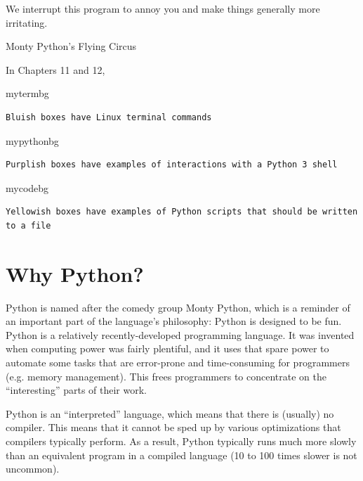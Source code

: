 
\epigraph{We interrupt this program to annoy you and make things generally more irritating.}{Monty Python's Flying Circus}

\minitoc

In Chapters 11 and 12,
\begin{tsession}{mytermbg}
\begin{verbatim}
Bluish boxes have Linux terminal commands
\end{verbatim}
\end{tsession}
\begin{tsession}{mypythonbg}
\begin{verbatim}
Purplish boxes have examples of interactions with a Python 3 shell
\end{verbatim}
\end{tsession}
\begin{tsession}{mycodebg}
\begin{verbatim}
Yellowish boxes have examples of Python scripts that should be written to a file
\end{verbatim}
\end{tsession}

\section{Why Python?}

Python is named after the comedy group Monty Python,
which is a reminder of an important part of the language's philosophy:
Python is designed to be fun.
Python is a relatively recently-developed programming language.
It was invented when computing power was fairly plentiful,
and it uses that spare power to automate some tasks
that are error-prone and time-consuming for programmers (e.g. memory management).
This frees programmers to concentrate on the ``interesting'' parts of their work.

Python is an ``interpreted'' language,
which means that there is (usually) no compiler.
This means that it cannot be sped up by various optimizations that compilers typically perform.
As a result, Python typically runs much more slowly than an equivalent program in a compiled language (10 to 100 times slower is not uncommon).

